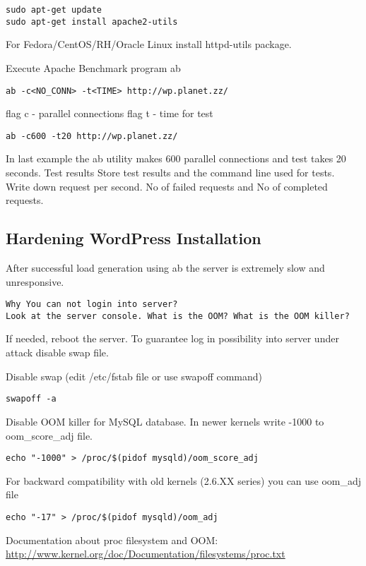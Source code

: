 \begin{verbatim}
sudo apt-get update
sudo apt-get install apache2-utils
\end{verbatim}

For Fedora/CentOS/RH/Oracle Linux install httpd-utils package.

Execute Apache Benchmark program ab
\begin{verbatim}
ab -c<NO_CONN> -t<TIME> http://wp.planet.zz/
\end{verbatim}
flag c - parallel connections
flag t - time for test

\begin{verbatim}
ab -c600 -t20 http://wp.planet.zz/
\end{verbatim}

In last example the ab utility makes 600 parallel connections and test takes 20 seconds.
Test results
Store test results and the command line used for tests.
Write down request per second. No of failed requests and No of completed requests.

\subsection{Hardening WordPress Installation}
After successful load generation using ab the server is extremely slow and unresponsive.

\begin{Verbatim}[samepage=true,frame=single,
label=Discussion,framesep=2mm,rulecolor=\color{blue},commandchars=\\\{\}]
Why You can not login into server?
Look at the server console. What is the OOM? What is the OOM killer?
\end{Verbatim}


If needed, reboot the server. To  guarantee log in possibility into server under attack disable swap file.

Disable swap (edit /etc/fstab file or use swapoff command)


\begin{verbatim}
swapoff -a
\end{verbatim}

Disable OOM killer for MySQL database. In newer kernels write -1000 to oom\_score\_adj file.

\begin{verbatim}
echo "-1000" > /proc/$(pidof mysqld)/oom_score_adj
\end{verbatim}
For backward compatibility with old kernels (2.6.XX series) you can use oom\_adj file
\begin{verbatim}
echo "-17" > /proc/$(pidof mysqld)/oom_adj
\end{verbatim}
Documentation about proc filesystem and OOM:
\url{http://www.kernel.org/doc/Documentation/filesystems/proc.txt}

